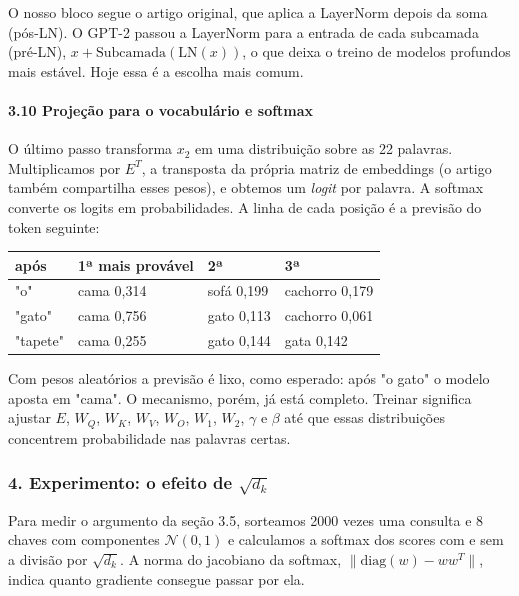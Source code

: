 \documentclass[12pt, a4paper]{article}
\begin{document}
O nosso bloco segue o artigo original, que aplica a LayerNorm depois da soma (pós-LN). O GPT-2 passou a LayerNorm para a entrada de cada subcamada (pré-LN), \(x + \text{Subcamada}(\text{LN}(x))\), o que deixa o treino de modelos profundos mais estável. Hoje essa é a escolha mais comum.

\paragraph{3.10 Projeção para o vocabulário e softmax}\label{310-projeuxe7uxe3o-para-o-vocabuluxe1rio-e-softmax}

O último passo transforma \(x_2\) em uma distribuição sobre as 22 palavras. Multiplicamos por \(E^T\), a transposta da própria matriz de embeddings (o artigo também compartilha esses pesos), e obtemos um \emph{logit} por palavra. A softmax converte os logits em probabilidades. A linha de cada posição é a previsão do token seguinte:

\begin{longtable}{@{}llll@{}}
\toprule\noalign{}
após & 1ª mais provável & 2ª & 3ª \\
\midrule\noalign{}
\endhead
\bottomrule\noalign{}
\endlastfoot
"o" & cama 0,314 & sofá 0,199 & cachorro 0,179 \\
"gato" & cama 0,756 & gato 0,113 & cachorro 0,061 \\
"tapete" & cama 0,255 & gato 0,144 & gata 0,142 \\
\end{longtable}

Com pesos aleatórios a previsão é lixo, como esperado: após "o gato" o modelo aposta em "cama". O mecanismo, porém, já está completo. Treinar significa ajustar \(E\), \(W_Q\), \(W_K\), \(W_V\), \(W_O\), \(W_1\), \(W_2\), \(\gamma\) e \(\beta\) até que essas distribuições concentrem probabilidade nas palavras certas.

\subsubsection{\texorpdfstring{4. Experimento: o efeito de \(\sqrt{d_k}\)}{4. Experimento: o efeito de \textbackslash sqrt\{d\_k\}}}\label{4-experimento-o-efeito-de-sqrtd_k}

Para medir o argumento da seção 3.5, sorteamos 2000 vezes uma consulta e 8 chaves com componentes \(\mathcal{N}(0, 1)\) e calculamos a softmax dos scores com e sem a divisão por \(\sqrt{d_k}\). A norma do jacobiano da softmax, \(\lVert \text{diag}(w) - ww^T \rVert\), indica quanto gradiente consegue passar por ela.
\end{document}
